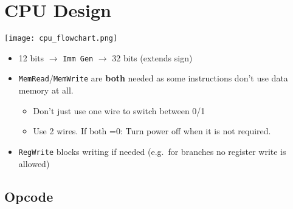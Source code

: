 \section{CPU Design}\label{cpu design}

\begin{center}
    \texttt{[image: cpu\_flowchart.png]}
\end{center}

\newpar{}
\begin{itemize}
    \item 12 bits $\to$ \texttt{Imm Gen} $\to$ 32 bits (extends sign)
    \item \texttt{MemRead}/\texttt{MemWrite} are \textbf{both} needed as some instructions don't use data memory at all.
          \begin{itemize}
              \item Don't just use one wire to switch between 0/1
              \item Use 2 wires. If both =0: Turn power off when it is not required.
          \end{itemize}
    \item \texttt{RegWrite} blocks writing if needed (e.g.\ for branches no register write is allowed)
\end{itemize}

\subsection{Opcode}


